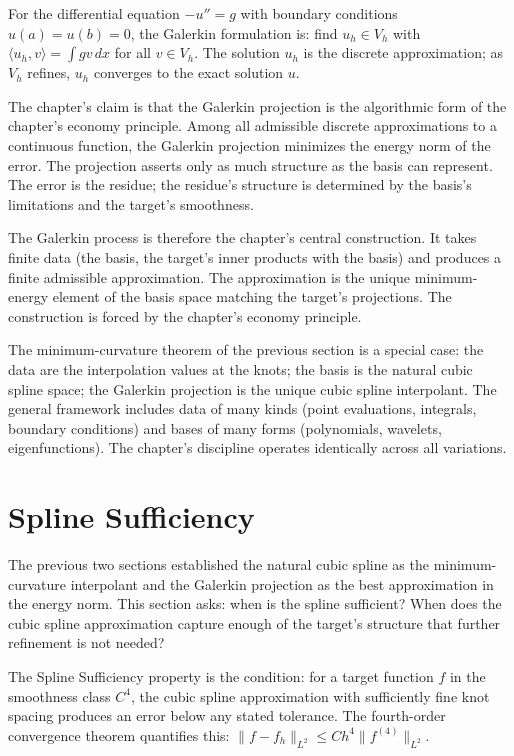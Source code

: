 For the differential equation $-u'' = g$ with boundary conditions
$u(a) = u(b) = 0$, the Galerkin formulation is: find $u_h \in V_h$
with $\langle u_h, v \rangle = \int g v \, dx$ for all $v \in V_h$.
The solution $u_h$ is the discrete approximation; as $V_h$ refines,
$u_h$ converges to the exact solution $u$.

The chapter's claim is that the Galerkin projection is the
algorithmic form of the chapter's economy principle. Among all
admissible discrete approximations to a continuous function, the
Galerkin projection minimizes the energy norm of the error. The
projection asserts only as much structure as the basis can
represent. The error is the residue; the residue's structure is
determined by the basis's limitations and the target's smoothness.

The Galerkin process is therefore the chapter's central
construction. It takes finite data (the basis, the target's inner
products with the basis) and produces a finite admissible
approximation. The approximation is the unique minimum-energy
element of the basis space matching the target's projections. The
construction is forced by the chapter's economy principle.

The minimum-curvature theorem of the previous section is a special
case: the data are the interpolation values at the knots; the
basis is the natural cubic spline space; the Galerkin projection
is the unique cubic spline interpolant. The general framework
includes data of many kinds (point evaluations, integrals,
boundary conditions) and bases of many forms (polynomials,
wavelets, eigenfunctions). The chapter's discipline operates
identically across all variations.

\section{Spline Sufficiency}
\label{se:spline-sufficiency}

The previous two sections established the natural cubic spline as the
minimum-curvature interpolant and the Galerkin projection as the best
approximation in the energy norm. This section asks: when is the
spline sufficient? When does the cubic spline approximation capture
enough of the target's structure that further refinement is not
needed?

The Spline Sufficiency property is the condition: for a target
function $f$ in the smoothness class $C^4$, the cubic spline
approximation with sufficiently fine knot spacing produces an error
below any stated tolerance. The fourth-order convergence theorem
quantifies this: $\|f - f_h\|_{L^2} \le C h^4 \|f^{(4)}\|_{L^2}$.

